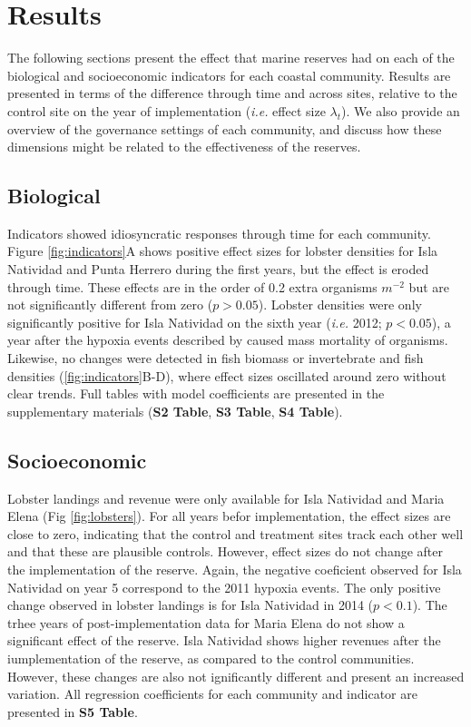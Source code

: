 \documentclass{frontiersSCNS}
\theoremstyle{definition}
\theoremstyle{definition}
\theoremstyle{definition}
\theoremstyle{remark}
\begin{document}
\section{Results}\label{results}

The following sections present the effect that marine reserves had on
each of the biological and socioeconomic indicators for each coastal
community. Results are presented in terms of the difference through time
and across sites, relative to the control site on the year of
implementation (\emph{i.e.} effect size \(\lambda_t\)). We also provide
an overview of the governance settings of each community, and discuss
how these dimensions might be related to the effectiveness of the
reserves.

\subsection{Biological}\label{biological}

Indicators showed idiosyncratic responses through time for each
community. Figure \ref{fig:indicators}A shows positive effect sizes for
lobster densities for Isla Natividad and Punta Herrero during the first
years, but the effect is eroded through time. These effects are in the
order of 0.2 extra organisms \(m^{-2}\) but are not significantly
different from zero (\(p > 0.05\)). Lobster densities were only
significantly positive for Isla Natividad on the sixth year (\emph{i.e.}
2012; \(p < 0.05\)), a year after the hypoxia events described by
\citet{micheli_2012-EU} caused mass mortality of organisms. Likewise, no
changes were detected in fish biomass or invertebrate and fish densities
(\ref{fig:indicators}B-D), where effect sizes oscillated around zero
without clear trends. Full tables with model coefficients are presented
in the supplementary materials (\textbf{S2 Table}, \textbf{S3 Table},
\textbf{S4 Table}).

\subsection{Socioeconomic}\label{socioeconomic}

Lobster landings and revenue were only available for Isla Natividad and
Maria Elena (Fig \ref{fig:lobsters}). For all years befor
implementation, the effect sizes are close to zero, indicating that the
control and treatment sites track each other well and that these are
plausible controls. However, effect sizes do not change after the
implementation of the reserve. Again, the negative coeficient observed
for Isla Natividad on year 5 correspond to the 2011 hypoxia events. The
only positive change observed in lobster landings is for Isla Natividad
in 2014 (\(p < 0.1\)). The trhee years of post-implementation data for
Maria Elena do not show a significant effect of the reserve. Isla
Natividad shows higher revenues after the iumplementation of the
reserve, as compared to the control communities. However, these changes
are also not ignificantly different and present an increased variation.
All regression coefficients for each community and indicator are
presented in \textbf{S5 Table}.
\end{document}
